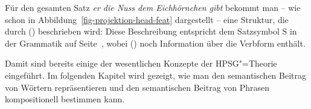 \noindent
Für den gesamten Satz \emph{er die Nuss dem Eichhörnchen gibt} bekommt man -- wie schon in
Abbildung~\ref{fig-projektion-head-feat} dargestellt -- eine Struktur, die durch ()
beschrieben wird:
\ea
{}
\z
Diese Beschreibung entspricht dem Satzsymbol S in der Grammatik auf
Seite~\pageref{bsp-grammatik-psg}, wobei () noch Information über die Verbform enthält.


Damit sind bereits einige der wesentlichen Konzepte der HPSG"=Theorie eingeführt. Im folgenden
Kapitel wird gezeigt, wie man den semantischen Beitrag von Wörtern repräsentieren und den
semantischen Beitrag von Phrasen kompositionell bestimmen kann.







